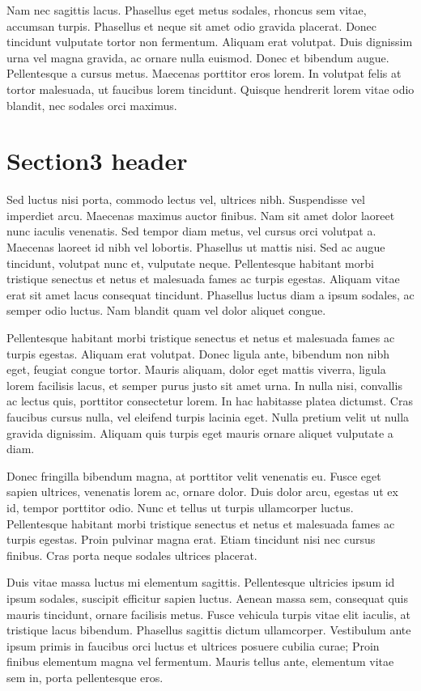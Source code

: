 \documentclass{article}
\begin{document}
Nam nec sagittis lacus. Phasellus eget metus sodales, rhoncus sem vitae, accumsan turpis. Phasellus et neque sit amet odio gravida placerat. Donec tincidunt vulputate tortor non fermentum. Aliquam erat volutpat. Duis dignissim urna vel magna gravida, ac ornare nulla euismod. Donec et bibendum augue. Pellentesque a cursus metus. Maecenas porttitor eros lorem. In volutpat felis at tortor malesuada, ut faucibus lorem tincidunt. Quisque hendrerit lorem vitae odio blandit, nec sodales orci maximus.

\section{Section3 header}

Sed luctus nisi porta, commodo lectus vel, ultrices nibh. Suspendisse vel imperdiet arcu. Maecenas maximus auctor finibus. Nam sit amet dolor laoreet nunc iaculis venenatis. Sed tempor diam metus, vel cursus orci volutpat a. Maecenas laoreet id nibh vel lobortis. Phasellus ut mattis nisi. Sed ac augue tincidunt, volutpat nunc et, vulputate neque. Pellentesque habitant morbi tristique senectus et netus et malesuada fames ac turpis egestas. Aliquam vitae erat sit amet lacus consequat tincidunt. Phasellus luctus diam a ipsum sodales, ac semper odio luctus. Nam blandit quam vel dolor aliquet congue.

Pellentesque habitant morbi tristique senectus et netus et malesuada fames ac turpis egestas. Aliquam erat volutpat. Donec ligula ante, bibendum non nibh eget, feugiat congue tortor. Mauris aliquam, dolor eget mattis viverra, ligula lorem facilisis lacus, et semper purus justo sit amet urna. In nulla nisi, convallis ac lectus quis, porttitor consectetur lorem. In hac habitasse platea dictumst. Cras faucibus cursus nulla, vel eleifend turpis lacinia eget. Nulla pretium velit ut nulla gravida dignissim. Aliquam quis turpis eget mauris ornare aliquet vulputate a diam.

Donec fringilla bibendum magna, at porttitor velit venenatis eu. Fusce eget sapien ultrices, venenatis lorem ac, ornare dolor. Duis dolor arcu, egestas ut ex id, tempor porttitor odio. Nunc et tellus ut turpis ullamcorper luctus. Pellentesque habitant morbi tristique senectus et netus et malesuada fames ac turpis egestas. Proin pulvinar magna erat. Etiam tincidunt nisi nec cursus finibus. Cras porta neque sodales ultrices placerat.

Duis vitae massa luctus mi elementum sagittis. Pellentesque ultricies ipsum id ipsum sodales, suscipit efficitur sapien luctus. Aenean massa sem, consequat quis mauris tincidunt, ornare facilisis metus. Fusce vehicula turpis vitae elit iaculis, at tristique lacus bibendum. Phasellus sagittis dictum ullamcorper. Vestibulum ante ipsum primis in faucibus orci luctus et ultrices posuere cubilia curae; Proin finibus elementum magna vel fermentum. Mauris tellus ante, elementum vitae sem in, porta pellentesque eros.
\end{document}
